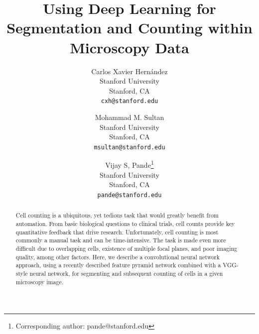 \documentclass[10pt,twocolumn,letterpaper]{article}
\begin{document}
\title{Using Deep Learning for Segmentation and Counting within Microscopy Data
	}

\author{Carlos Xavier Hern\'{a}ndez\\
Stanford University\\
Stanford, CA\\
{\tt\small cxh@stanford.edu}
\and
Mohammad M. Sultan\\
Stanford University\\
Stanford, CA\\
{\tt\small msultan@stanford.edu}
\and
Vijay S, Pande\thanks{Corresponding author: pande@stanford.edu}\\
Stanford University\\
Stanford, CA\\
{\tt\small pande@stanford.edu}
}

\maketitle

\begin{abstract}
Cell counting is a ubiquitous, yet tedious task that would greatly benefit from automation.
From basic biological questions to clinical trials, cell counts provide key quantitative
feedback that drive research. Unfortunately, cell counting is most commonly a manual task
and can be time-intensive. The task is made even more difficult due to overlapping cells,
existence of multiple focal planes, and poor imaging quality, among other factors.
Here, we describe a convolutional neural network approach, using a recently described
feature pyramid network combined with a VGG-style neural network, for segmenting and
subsequent counting of cells in a given microscopy image.
   
\end{abstract}

\end{document}
